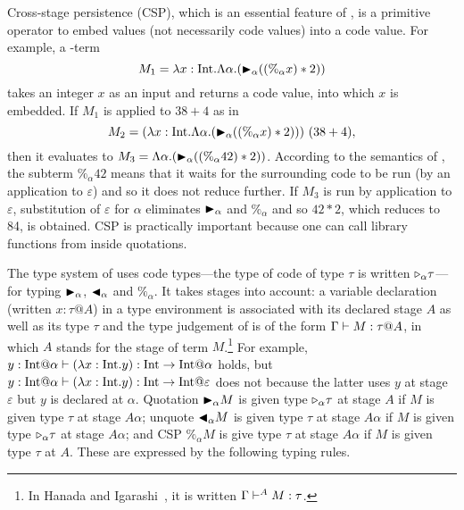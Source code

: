
Cross-stage persistence (CSP), which is an essential feature of \LTP, is a
primitive operator to embed values (not necessarily code values) into a code
value. For example, a \LTP-term
\[
  M_1 = \lambda x:\textrm{Int}.\Lambda\alpha.({\mathop{\blacktriangleright}}_\alpha ((\%_\alpha x) * 2))
\]
takes an integer \(x\) as an input and returns a code value, into
which \(x\) is embedded.  If $M_1$ is applied to $38 + 4$ as in
\[
  M_2 = (\lambda x:\textrm{Int}.\Lambda\alpha.({\mathop{\blacktriangleright}}_\alpha ((\%_\alpha x) * 2)))\ (38 + 4),
\]
then it evaluates to \(M_3 = \Lambda\alpha.({\mathop{\blacktriangleright}}_\alpha ((\%_\alpha 42) * 2))\).
According to the semantics of \LTP, the subterm $\%_\alpha 42$ means that it
waits for the surrounding code to be run (by an application to $\varepsilon$)
and so it does not reduce further.  If \(M_3\) is run by application to
\(\varepsilon\), substitution of \(\varepsilon\) for \(\alpha\) eliminates
\({\mathop{\blacktriangleright}}_\alpha\) and \(\%_\alpha\) and so \(42 * 2\), which reduces to 84, is
obtained.  CSP is practically important because one can call library functions
from inside quotations.


The type system of \LTP uses code types---the type of code of type
\(\tau\) is written \({\mathop{\triangleright}}_\alpha \tau\)---for typing \({\mathop{\blacktriangleright}}_\alpha\),
\({\mathop{\blacktriangleleft}}_\alpha\) and \(\%_\alpha\).  It takes stages into account: a
variable declaration (written $x:\tau@A$) in a type environment is associated with its
declared stage $A$ as well as its type $\tau$ and the type judgement of \LTP is of
the form $\G \vdash M : \tau@A$, in which $A$ stands for the stage
of term $M$.\footnote{%
  In Hanada and Igarashi~\cite{HanadaIgarashi2014CSP}, it is written
  $\Gamma \vdash^A M : \tau$.
  }
For example,
$y:\I@\alpha \vdash (\lambda x:\I.y) : \I \to \I @ \alpha$ holds, but
$y:\I@\alpha \vdash (\lambda x:\I.y) : \I \to \I @ \varepsilon$ does
not because the latter uses $y$ at stage \(\varepsilon\) but $y$ is
declared at $\alpha$.  Quotation \({\mathop{\blacktriangleright}}_\alpha M\) is given type
\({\mathop{\triangleright}}_\alpha \tau\) at stage \(A\) if \(M\) is given type \(\tau\) at
stage \(A\alpha\); unquote \({\mathop{\blacktriangleleft}}_\alpha M\) is given type \(\tau\)
at stage \(A\alpha\) if \(M\) is given type \({\mathop{\triangleright}}_\alpha \tau\) at
stage \(A\alpha\); and CSP \(\%_\alpha M\) is give type \(\tau\)
at stage \(A\alpha\) if \(M\) is given type \(\tau\) at \(A\).
These are expressed by the following typing rules.
\begin{center}
	 \hfil
	 \hfil
\end{center}

